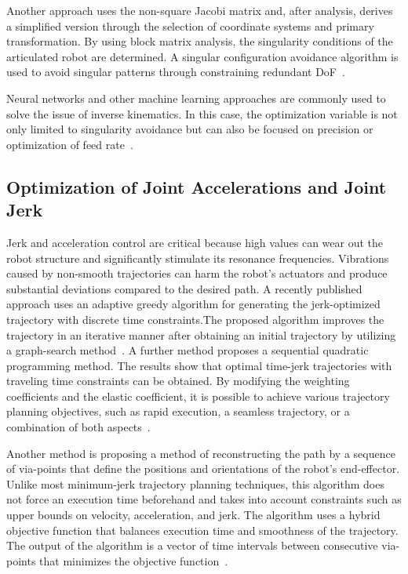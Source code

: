 Another approach uses the non-square Jacobi matrix and, after analysis, derives a simplified version through the selection of coordinate systems and primary transformation. By using block matrix analysis, the singularity conditions of the articulated robot are determined.
A singular configuration avoidance algorithm is used to avoid singular patterns through constraining redundant \acrshort{DoF}~\cite{Shi.2021}.

Neural networks and other machine learning approaches are commonly used to solve the issue of inverse kinematics. In this case, the optimization variable is not only limited to singularity avoidance but can also be focused on precision or optimization of feed rate~\cite{Wei.2014}.
\newpage
\subsection{Optimization of Joint Accelerations and Joint Jerk}

Jerk and acceleration control are critical because high values can wear out the robot structure and significantly stimulate its resonance frequencies. Vibrations caused by non-smooth trajectories can harm the robot's actuators and produce substantial deviations compared to the desired path. A recently published approach uses an adaptive greedy algorithm for generating the jerk-optimized trajectory with discrete time constraints.\newline The proposed algorithm improves the trajectory in an iterative manner after obtaining an initial trajectory by utilizing a graph-search method~\cite{Dai.2020}.
A further method proposes a sequential quadratic programming method. The results show that optimal time-jerk trajectories with traveling time constraints can be obtained. By modifying the weighting coefficients and the elastic coefficient, it is possible to achieve various trajectory planning objectives, such as rapid execution, a seamless trajectory, or a combination of both aspects~\cite{Jiang.2017}. 
 
Another method is proposing a method of reconstructing the path by a sequence of via-points that define the positions and orientations of the robot's end-effector. Unlike most minimum-jerk trajectory planning techniques, this algorithm does not force an execution time beforehand and takes into account constraints such as upper bounds on velocity, acceleration, and jerk. The algorithm uses a hybrid objective function that balances execution time and smoothness of the trajectory. The output of the algorithm is a vector of time intervals between consecutive via-points that minimizes the objective function~\cite{Gasparetto.2010}. 


